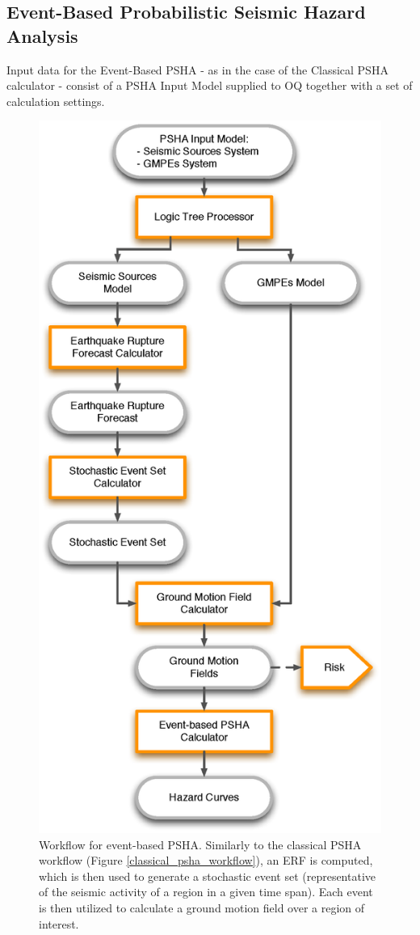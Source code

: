 \subsection{Event-Based Probabilistic Seismic Hazard Analysis}
\label{section:event-basedPSHA}
Input data for the Event-Based PSHA - as in the case of the Classical PSHA 
calculator - consist of a PSHA Input Model supplied to OQ together with a 
set of calculation settings.
%
\begin{figure}
\centering
\includegraphics[width=12cm]{./Figures/Part_Hazard/event_based_workflow.eps}
\caption{Workflow for event-based PSHA. Similarly to the classical PSHA workflow 
(Figure \ref{classical_psha_workflow}), an ERF is computed, which is then used 
to generate a stochastic event set (representative of the seismic activity of 
a region in a given time span). Each event is then utilized to calculate a 
ground motion field over a region of interest.}
\label{event_based_workflow}
\end{figure}
